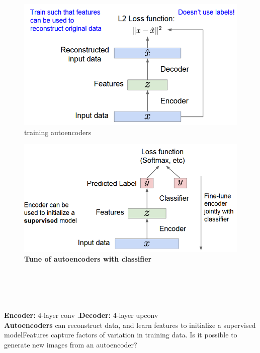 \documentclass[11pt]{article}
\begin{document}
\begin{minipage}{0.5\textwidth}
\begin{figure} [H]
\centering 
\includegraphics[scale=0.5]{L1216.pdf}
\caption{training autoencoders }
\label{fig:L1216}
\end{figure}
\end{minipage}\begin{minipage}{0.5\textwidth}
\begin{figure} [H]
\centering 
\includegraphics[scale=0.5]{L1217.pdf}
\caption{\textbf{ Tune of autoencoders with classifier} }
\label{fig:L1217}
\end{figure}
\end{minipage}
\\\\\\\\
\textbf{Encoder:} 4-layer conv .\textbf{Decoder:} 4-layer upconv\\
\textbf{Autoencoders} can reconstruct data, and learn features to initialize a supervised modelFeatures capture factors of variation in training data. Is it possible to generate new images from an autoencoder?\\\\
\end{document}
